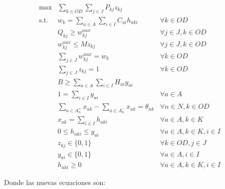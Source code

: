 \begin{align}
  \max          & \sum_{k \in OD} \sum_{j \in J} P_{kj} z_{kj}                          & \label{eq:objectivefinalalt} \\
  \text{s.t.}\; & w_k = \sum_{a \in A} \sum_{i \in I} C_{ai}h_{aki}                     & \forall k \in OD \label{eq:shortestpathaltfinal} \\
                & Q_{kj} \geq w^{aux}_{kj}                                              & \forall j \in J, k \in OD \label{eq:breakpointsalt} \\
                & w^{aux}_{kj} \leq M z_{kj}                                            & \forall j \in J, k \in OD \\
                & \sum_{j \in J} w^{aux}_{kj} = w_k                                     & \forall k \in OD \\
                & \sum_{j \in J} z_{kj} = 1                                             & \forall k \in OD \label{eq:singularbreakpointalt} \\
                & B \geq \sum_{a \in A} \sum_{i \in I} H_{ai}y_{ai}                     & \label{eq:respectbudgetaltfinal} \\
                & 1 = \sum_{i \in I} y_{ai}                                             & \forall a \in A \label{eq:alwaysoneyaltfinal} \\
                & \sum_{a \in A_n^+} x_{ak} - \sum_{a \in A_n^-} x_{ak} = \theta_{nk}   & \forall n \in N, k \in OD \label{eq:flowbalancealtfinal} \\
                & x_{ak} = \sum_{i \in I} h_{aki}                                       & \forall a \in A, k \in K \label{eq:flowactivationalt} \\
                & 0 \leq h_{aki} \leq y_{ai}                                            & \forall a \in A, k \in K, i \in I \label{eq:respectinfraalt} \\
                & z_{kj} \in \{0,1\}                                                    & \forall k \in OD, j \in J \nonumber \\
                & y_{ai} \in \{0,1\}                                                    & \forall a \in A, i \in I \nonumber \\
                & h_{aki} \geq 0                                                        & \forall a \in A, k \in K, i \in I \nonumber
\end{align}

Donde las nuevas ecuaciones son:

